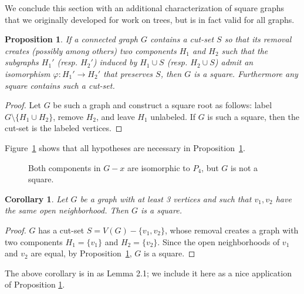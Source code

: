 \documentclass{article}
\newtheorem{proposition}[theorem]{Proposition}
\newtheorem{corollary}[theorem]{Corollary}
\theoremstyle{definition}
\begin{document}
We conclude this section with an additional characterization of square graphs that we originally developed for work on trees, but is in fact valid for all graphs.

\begin{proposition}\label{prop:2components}
    If a connected graph $G$ contains a cut-set $S$ so that its removal creates (possibly among others) two components $H_1$ and $H_2$ such that the subgraphs $H_1'$ (resp. $H_2'$) induced by $H_1 \cup S$ (resp. $H_2 \cup S$) admit an isomorphism $\varphi: H_1'\to H_2'$  that preserves $S$, then $G$ is a square.  Furthermore any square contains such a cut-set.
\end{proposition}
\begin{proof}
    Let $G$ be such a graph and construct a square root as follows: label $G \setminus \{H_1 \cup H_2\}$, remove $H_2$, and leave $H_1$ unlabeled.  If $G$ is such a square, then the cut-set is the labeled vertices.
\end{proof}

Figure~\ref{fig:not-squ} shows that all hypotheses are necessary in Proposition~\ref{prop:2components}. 

\begin{figure}[ht] 
\begin{center} 

\caption{Both components in $G-x$ are isomorphic to $P_4$, but $G$ is not a square.}
\label{fig:not-squ}

\end{center}
\end{figure}


\begin{corollary} \label{cor:twins}
Let $G$ be a graph with at least 3 vertices and such that $v_1,v_2$ have the same open neighborhood. Then $G$ is a square. 
\end{corollary}
\begin{proof}
$G$ has a cut-set $S=V(G)-\{v_1, v_2\}$, whose removal creates a graph with two components $H_1=\{v_1\}$ and $H_2=\{v_2\}$. Since the open neighborhoods of $v_1$ and $v_2$ are equal, by Proposition~\ref{prop:2components}, $G$ is a square.
\end{proof}
The above corollary is in \cite{AAP} as Lemma 2.1; we include it here as a nice application of Proposition \ref{prop:2components}.
\end{document}
